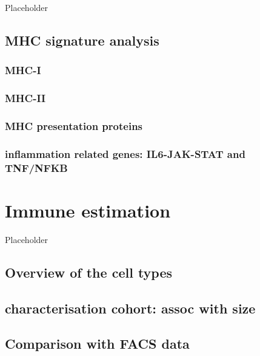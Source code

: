 \documentclass[
]{book}
\begin{document}
Placeholder

\hypertarget{mhc-signature-analysis}{%
\section{MHC signature analysis}\label{mhc-signature-analysis}}

\hypertarget{mhc-i}{%
\subsection{MHC-I}\label{mhc-i}}

\hypertarget{mhc-ii}{%
\subsection{MHC-II}\label{mhc-ii}}

\hypertarget{mhc-presentation-proteins}{%
\subsection{MHC presentation proteins}\label{mhc-presentation-proteins}}

\hypertarget{inflammation-related-genes-il6-jak-stat-and-tnfnfkb}{%
\subsection{inflammation related genes: IL6-JAK-STAT and TNF/NFKB}\label{inflammation-related-genes-il6-jak-stat-and-tnfnfkb}}

\hypertarget{immune-estimation}{%
\chapter{Immune estimation}\label{immune-estimation}}

Placeholder

\hypertarget{overview-of-the-cell-types}{%
\section{Overview of the cell types}\label{overview-of-the-cell-types}}

\hypertarget{characterisation-cohort-assoc-with-size}{%
\section{characterisation cohort: assoc with size}\label{characterisation-cohort-assoc-with-size}}

\hypertarget{comparison-with-facs-data}{%
\section{Comparison with FACS data}\label{comparison-with-facs-data}}
\end{document}
